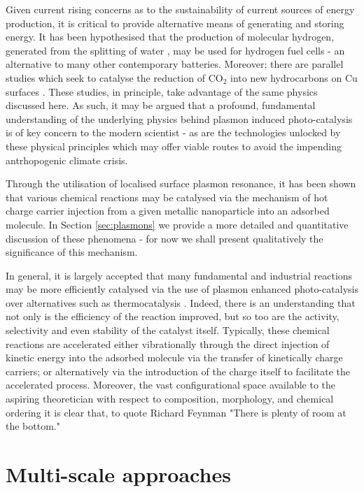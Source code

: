 Given current rising concerns as to the sustainability of current sources of energy production, it is critical to provide alternative means of generating and storing energy. It has been hypothesised that the production of molecular hydrogen, generated from the splitting of water \cite{H2Dissociate,MoreH2Dissociate}, may be used for hydrogen fuel cells - an alternative to many other contemporary batteries. Moreover; there are parallel studies which seek to catalyse the reduction of CO$_{2}$ into new hydrocarbons on Cu surfaces \cite{LSPCatalysis}. These studies, in principle, take advantage of the same physics discussed here. As such, it may be argued that a profound, fundamental understanding of the underlying physics behind plasmon induced photo-catalysis is of key concern to the modern scientist - as are the technologies unlocked by these physical principles which may offer viable routes to avoid the impending antrhopogenic climate crisis.

Through the utilisation of localised surface plasmon resonance, it has been shown that various chemical reactions may be catalysed via the mechanism of hot charge carrier injection from a given metallic nanoparticle into an adsorbed molecule. In Section \ref{sec:plasmons} we provide a more detailed and quantitative discussion of these phenomena - for now we shall present qualitatively the significance of this mechanism.

In general, it is largely accepted that many fundamental and industrial reactions may be more efficiently catalysed via the use of plasmon enhanced photo-catalysis over alternatives such as thermocatalysis \cite{ZHAO2019920,SAMANTA2017621}. Indeed, there is an understanding that not only is the efficiency of the reaction improved, but so too are the activity, selectivity and even stability of the catalyst itself. Typically, these chemical reactions are accelerated either vibrationally through the direct injection of kinetic energy into the adsorbed molecule via the transfer of kinetically charge carriers; or alternatively via the introduction of the charge itself to facilitate the accelerated process. Moreover, the vast configurational space available to the aspiring theoretician with respect to composition, morphology, and chemical ordering it is clear that, to quote Richard Feynman "There is plenty of room at the bottom."

\section{Multi-scale approaches}
\label{sec:multiscale}

